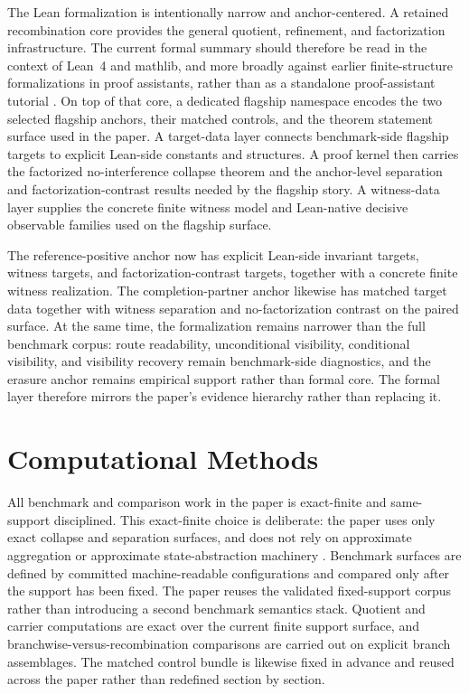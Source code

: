 \documentclass[11pt]{article}
\theoremstyle{definition}
\begin{document}
The Lean formalization is intentionally narrow and anchor-centered. A retained recombination core provides the general quotient, refinement, and factorization infrastructure. The current formal summary should therefore be read in the context of Lean~4 and mathlib, and more broadly against earlier finite-structure formalizations in proof assistants, rather than as a standalone proof-assistant tutorial \cite{deMouraUllrich2021,MathlibCommunity2020,Gonthier2008,Paulson2015,LiuHasanTahar2011}. On top of that core, a dedicated flagship namespace encodes the two selected flagship anchors, their matched controls, and the theorem statement surface used in the paper. A target-data layer connects benchmark-side flagship targets to explicit Lean-side constants and structures. A proof kernel then carries the factorized no-interference collapse theorem and the anchor-level separation and factorization-contrast results needed by the flagship story. A witness-data layer supplies the concrete finite witness model and Lean-native decisive observable families used on the flagship surface.

The reference-positive anchor now has explicit Lean-side invariant targets, witness targets, and factorization-contrast targets, together with a concrete finite witness realization. The completion-partner anchor likewise has matched target data together with witness separation and no-factorization contrast on the paired surface. At the same time, the formalization remains narrower than the full benchmark corpus: route readability, unconditional visibility, conditional visibility, and visibility recovery remain benchmark-side diagnostics, and the erasure anchor remains empirical support rather than formal core. The formal layer therefore mirrors the paper's evidence hierarchy rather than replacing it.
 \section{Computational Methods}

All benchmark and comparison work in the paper is exact-finite and same-support disciplined. This exact-finite choice is deliberate: the paper uses only exact collapse and separation surfaces, and does not rely on approximate aggregation or approximate state-abstraction machinery \cite{KemenySnell1976,Buchholz1994,GivanDeanGreig2003,LiWalshLittman2006}. Benchmark surfaces are defined by committed machine-readable configurations and compared only after the support has been fixed. The paper reuses the validated fixed-support corpus rather than introducing a second benchmark semantics stack. Quotient and carrier computations are exact over the current finite support surface, and branchwise-versus-recombination comparisons are carried out on explicit branch assemblages. The matched control bundle is likewise fixed in advance and reused across the paper rather than redefined section by section.
\end{document}
